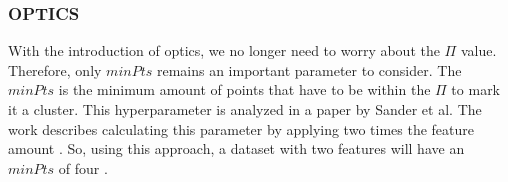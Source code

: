 \subsubsection{OPTICS} \label{theory:clustering-dbscan}
With the introduction of \gls{optics}, we no longer need to worry about the $\Pi$ value.
Therefore, only $minPts$ remains an important parameter to consider. \newline
The $minPts$ is the minimum amount of points that have to be within the $\Pi$ to mark it a cluster.
This hyperparameter is analyzed in a paper by Sander et al.
The work describes calculating this parameter by applying two times the feature amount \citep{sander_density-based_1998}.
So, using this approach, a dataset with two features will have an $minPts$ of four \citep{schubert_dbscan_2017}.


